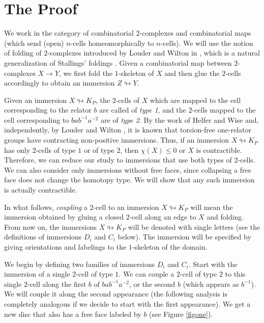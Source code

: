 \documentclass{amsart}
\theoremstyle{plain}
\newtheorem{lem}[thm]{Lemma}
\theoremstyle{definition}
\theoremstyle{remark}
\numberwithin{equation}{section}
\begin{document}
\section{The Proof}
We work in the category of combinatorial $2$-complexes and combinatorial maps (which send (open) $n$-cells homeomorphically to $n$-cells). We will use the notion of folding of $2$-complexes introduced by Louder and Wilton in \cite{LW20}, which is a natural generalization of Stallings' foldings \cite{Sta83}.
Given a combinatorial map between  $2$-complexes $X\to Y$, we first fold the $1$-skeleton of $X$ and then glue the $2$-cells accordingly to obtain an immersion $Z\looparrowright Y$.

Given an immersion $X\looparrowright K_P$, the $2$-cells of $X$ which are mapped to the cell corresponding to the relator $b$ are called of \emph{type 1}, and the $2$-cells mapped to the cell corresponding to $bab^{-1}a^{-2}$ are of \emph{type 2}. 
By the work of Helfer and Wise \cite{HW16} and, independently, by Louder and Wilton \cite{LW17}, it is known that torsion-free one-relator groups have contracting non-positive immersions.
Thus, if an immersion $X\looparrowright K_P$ has only  $2$-cells of type $1$ or of type $2$, then $\chi(X)\leq 0$ or $X$ is contractible.
Therefore, we can reduce our study to immersions that use both types of $2$-cells.
We can also consider only immersions without free faces, since collapsing a free face does not change the homotopy type.
We will show that any such immersion is actually contractible.

In what follows, \emph{coupling} a $2$-cell to an immersion $X\looparrowright K_P$ will mean the immersion obtained by gluing a closed $2$-cell along an edge to $X$ and folding. From now on, the immersions $X\looparrowright K_P$ will be denoted with single letters (see the definitions of immersions $D_i$ and $C_i$ below). The immersion will be specified by giving orientations and  labelings to the $1$-skeleton of the domain.

We begin by defining two families of immersions $D_i$ and $C_i$. Start with the immersion of a single $2$-cell of type $1$.
We can couple a $2$-cell of type $2$ to this single $2$-cell along the first $b$ of $bab^{-1}a^{-2}$, or the second $b$ (which appears as $b^{-1}$).
We will couple it along the second appearance (the following analysis is completely analogous if we decide to start with the first appearance).
We get a new disc that also has a free face labeled by $b$ (see Figure \ref{figone}).
\end{document}
